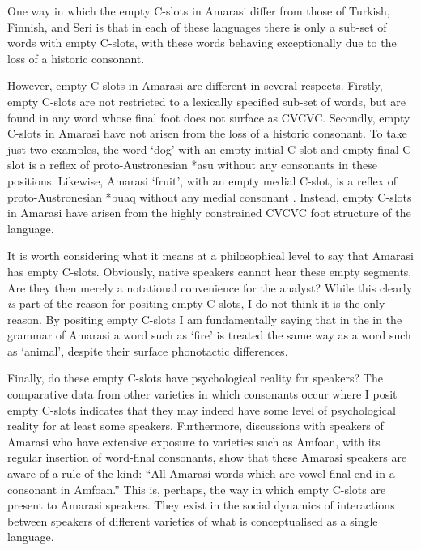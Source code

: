 One way in which the empty C-slots in Amarasi differ from those of Turkish, Finnish, and Seri
is that in each of these languages there is only a sub-set of words with empty C-slots,
with these words behaving exceptionally due to the loss of a historic consonant. %

However, empty C-slots in Amarasi are different in several respects.
Firstly, empty C-slots are not restricted to a lexically specified sub-set of words,
but are found in any word whose final foot does not surface as CVCVC.
Secondly, empty C-slots in Amarasi have not arisen from the loss of a historic consonant.
To take just two examples, the word  `dog' with an empty initial C-slot
and empty final C-slot is a reflex of proto-Austronesian
*asu without any consonants in these positions.
Likewise, Amarasi  `fruit', with an empty medial C-slot,
is a reflex of proto-Austronesian *buaq without any medial consonant \citep{bltr}.
Instead, empty C-slots in Amarasi have arisen from the highly
constrained CVCVC foot structure of the language.

It is worth considering what it means at a philosophical
level to say that Amarasi has empty C-slots.
Obviously, native speakers cannot hear these empty segments.
Are they then merely a notational convenience for the analyst?
While this clearly \emph{is} part of the reason for positing empty C-slots,
I do not think it is the only reason.
By positing empty C-slots I am fundamentally saying
that in the in the grammar of Amarasi a word such as  `fire' is 
treated the same way as a word such as  `animal',
despite their surface phonotactic differences.

Finally, do these empty C-slots have psychological reality for speakers?
The comparative data from other varieties in which consonants occur where I posit
empty C-slots indicates that they may indeed
have some level of psychological reality for at least some speakers.
Furthermore, discussions with speakers of Amarasi
who have extensive exposure to varieties such as Amfo{\Q}an,
with its regular insertion of word-final consonants,
show that these Amarasi speakers are aware of a rule of the kind:
``All Amarasi words which are vowel final end in a consonant in Amfo{\Q}an.''
This is, perhaps, the way in which empty C-slots are present to Amarasi speakers.
They exist in the social dynamics of interactions between
speakers of different varieties of what is conceptualised
as a single language.